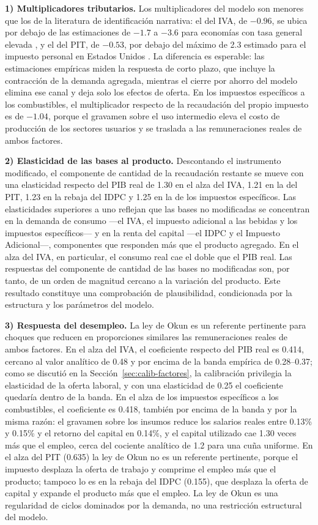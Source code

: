 \documentclass[11pt]{article}
\begin{document}
\textbf{1) Multiplicadores tributarios.} Los multiplicadores del modelo son menores que los de la literatura de identificación narrativa: el del IVA, de $-0.96$, se ubica por debajo de las estimaciones de $-1.7$ a $-3.6$ para economías con tasa general elevada \cite{riera_crichton_etal_2016,gunter_etal_2021}, y el del PIT, de $-0.53$, por debajo del máximo de 2.3 estimado para el impuesto personal en Estados Unidos \cite{mertens_ravn_2013}. La diferencia es esperable: las estimaciones empíricas miden la respuesta de corto plazo, que incluye la contracción de la demanda agregada, mientras el cierre por ahorro del modelo elimina ese canal y deja solo los efectos de oferta. En los impuestos específicos a los combustibles, el multiplicador respecto de la recaudación del propio impuesto es de $-1.04$, porque el gravamen sobre el uso intermedio eleva el costo de producción de los sectores usuarios y se traslada a las remuneraciones reales de ambos factores.

\textbf{2) Elasticidad de las bases al producto.} Descontando el instrumento modificado, el componente de cantidad de la recaudación restante se mueve con una elasticidad respecto del PIB real de 1.30 en el alza del IVA, 1.21 en la del PIT, 1.23 en la rebaja del IDPC y 1.25 en la de los impuestos específicos. Las elasticidades superiores a uno reflejan que las bases no modificadas se concentran en la demanda de consumo ---el IVA, el impuesto adicional a las bebidas y los impuestos específicos--- y en la renta del capital ---el IDPC y el Impuesto Adicional---, componentes que responden más que el producto agregado. En el alza del IVA, en particular, el consumo real cae el doble que el PIB real. Las respuestas del componente de cantidad de las bases no modificadas son, por tanto, de un orden de magnitud cercano a la variación del producto. Este resultado constituye una comprobación de plausibilidad, condicionada por la estructura y los parámetros del modelo.

\textbf{3) Respuesta del desempleo.} La ley de Okun es un referente pertinente para choques que reducen en proporciones similares las remuneraciones reales de ambos factores. En el alza del IVA, el coeficiente respecto del PIB real es 0.414, cercano al valor analítico de 0.48 y por encima de la banda empírica de 0.28--0.37; como se discutió en la Sección~\ref{sec:calib-factores}, la calibración privilegia la elasticidad de la oferta laboral, y con una elasticidad de 0.25 el coeficiente quedaría dentro de la banda. En el alza de los impuestos específicos a los combustibles, el coeficiente es 0.418, también por encima de la banda y por la misma razón: el gravamen sobre los insumos reduce los salarios reales entre 0.13\% y 0.15\% y el retorno del capital en 0.14\%, y el capital utilizado cae 1.30 veces más que el empleo, cerca del cociente analítico de 1.2 para una cuña uniforme. En el alza del PIT (0.635) la ley de Okun no es un referente pertinente, porque el impuesto desplaza la oferta de trabajo y comprime el empleo más que el producto; tampoco lo es en la rebaja del IDPC (0.155), que desplaza la oferta de capital y expande el producto más que el empleo. La ley de Okun es una regularidad de ciclos dominados por la demanda, no una restricción estructural del modelo.
\end{document}
